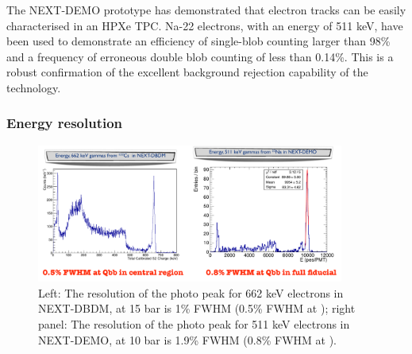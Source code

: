 The NEXT-DEMO prototype has demonstrated that electron tracks can be easily characterised in an HPXe TPC. Na-22 electrons, with an energy of 511 keV, have been used to demonstrate an efficiency of single-blob counting larger than 98\% and a frequency of erroneous double blob counting of less than 0.14\%. This is a robust confirmation of the excellent background rejection capability of the technology. 

\subsubsection*{Energy resolution}


\begin{figure}
\centering
\includegraphics[width=0.9\textwidth]{img/ERS2.pdf}
\caption{\small Left: The resolution of the photo peak for 662 keV electrons in NEXT-DBDM, at 15 bar is 1\% FWHM (0.5\% FWHM at \Qbb); right panel: The resolution of the photo peak for 511 keV electrons in NEXT-DEMO, at 10 bar is 1.9\% FWHM (0.8\% FWHM at \Qbb).}\label{fig.ERES}
\end{figure}

